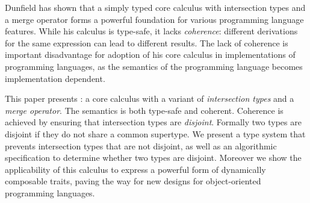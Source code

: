 Dunfield has shown that a simply typed core calculus with
intersection types and a merge operator forms a powerful foundation
for various programming language features. While his calculus
is type-safe, it lacks \emph{coherence}:
different derivations for the same expression can lead to different
results. The lack of coherence is important disadvantage for adoption
of his core calculus in implementations of programming languages, as
the semantics of the programming language becomes implementation
dependent. 

This paper presents \name: a core calculus with a variant of
\emph{intersection types} and a
\emph{merge operator}. The semantics \name is both type-safe and
coherent. Coherence is achieved by ensuring that intersection types
are \emph{disjoint}. Formally two types are disjoint if they do not
share a common supertype. We present a type system that prevents
intersection types that are not disjoint, as well as an algorithmic
specification to determine whether two types are disjoint. Moreover 
we show the applicability of this calculus to express a powerful 
form of dynamically composable traits, paving the way for new 
designs for object-oriented programming languages. 
